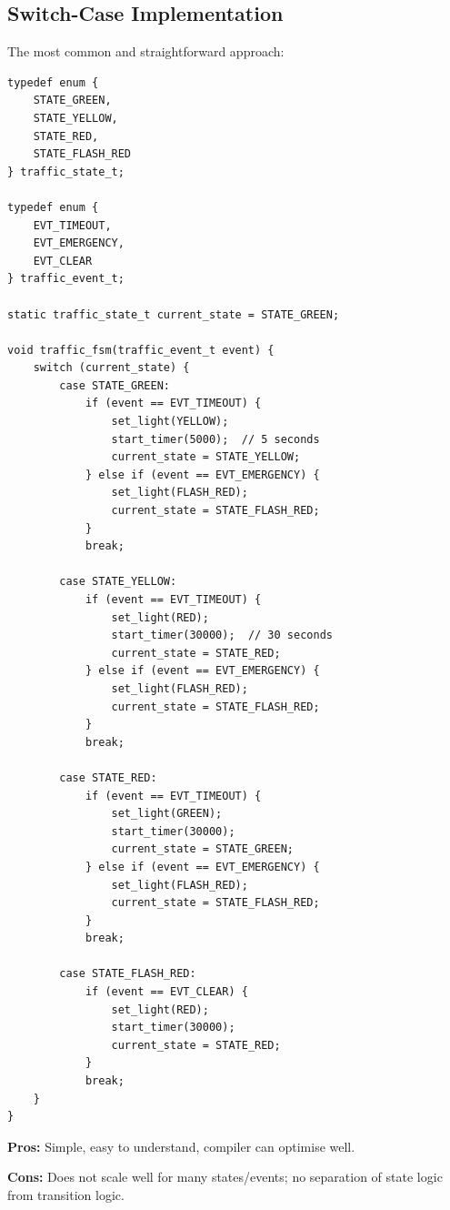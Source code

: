 \subsection{Switch-Case Implementation}

The most common and straightforward approach:

\begin{lstlisting}[style=C, caption={Switch-case FSM implementation for the traffic light controller.}]
typedef enum {
    STATE_GREEN,
    STATE_YELLOW,
    STATE_RED,
    STATE_FLASH_RED
} traffic_state_t;

typedef enum {
    EVT_TIMEOUT,
    EVT_EMERGENCY,
    EVT_CLEAR
} traffic_event_t;

static traffic_state_t current_state = STATE_GREEN;

void traffic_fsm(traffic_event_t event) {
    switch (current_state) {
        case STATE_GREEN:
            if (event == EVT_TIMEOUT) {
                set_light(YELLOW);
                start_timer(5000);  // 5 seconds
                current_state = STATE_YELLOW;
            } else if (event == EVT_EMERGENCY) {
                set_light(FLASH_RED);
                current_state = STATE_FLASH_RED;
            }
            break;

        case STATE_YELLOW:
            if (event == EVT_TIMEOUT) {
                set_light(RED);
                start_timer(30000);  // 30 seconds
                current_state = STATE_RED;
            } else if (event == EVT_EMERGENCY) {
                set_light(FLASH_RED);
                current_state = STATE_FLASH_RED;
            }
            break;

        case STATE_RED:
            if (event == EVT_TIMEOUT) {
                set_light(GREEN);
                start_timer(30000);
                current_state = STATE_GREEN;
            } else if (event == EVT_EMERGENCY) {
                set_light(FLASH_RED);
                current_state = STATE_FLASH_RED;
            }
            break;

        case STATE_FLASH_RED:
            if (event == EVT_CLEAR) {
                set_light(RED);
                start_timer(30000);
                current_state = STATE_RED;
            }
            break;
    }
}
\end{lstlisting}

\textbf{Pros:} Simple, easy to understand, compiler can optimise well.

\textbf{Cons:} Does not scale well for many states/events; no separation of state logic from transition logic.

